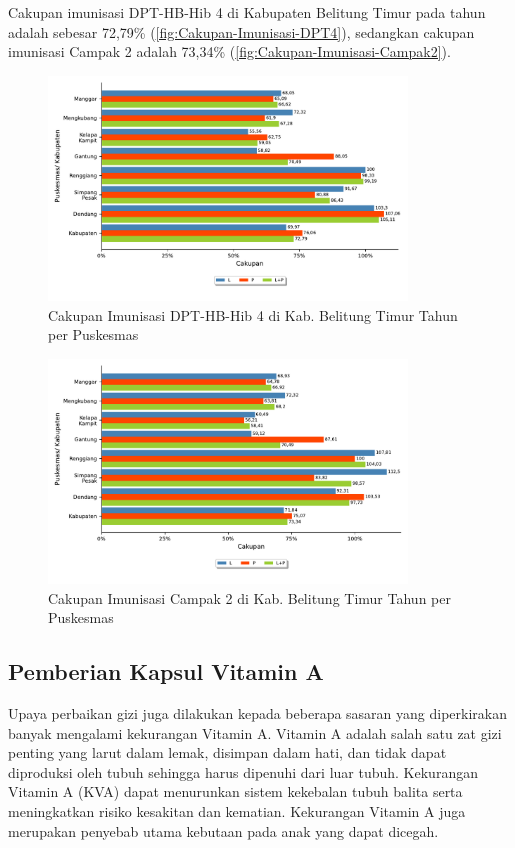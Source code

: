 Cakupan imunisasi DPT-HB-Hib 4 di Kabupaten Belitung Timur pada tahun \tP
adalah sebesar 72,79\% (\autoref{fig:Cakupan-Imunisasi-DPT4}), sedangkan cakupan imunisasi Campak 2 adalah 73,34\% (\autoref{fig:Cakupan-Imunisasi-Campak2}).

\begin{figure}[H]
    \centering
    \includegraphics[width=0.85\textwidth]{bab_05/bab_05_21a_imunDPTlanjut}
    \caption{Cakupan Imunisasi DPT-HB-Hib 4 di Kab. Belitung Timur Tahun \tP per Puskesmas}
    \label{fig:Cakupan-Imunisasi-DPT4}
\end{figure}

\begin{figure}[H]
    \centering
    \includegraphics[width=0.85\textwidth]{bab_05/bab_05_21b_imunCampakLanjut}
    \caption{Cakupan Imunisasi Campak 2 di Kab. Belitung Timur Tahun \tP per Puskesmas}
    \label{fig:Cakupan-Imunisasi-Campak2}
\end{figure}

\subsection{Pemberian Kapsul Vitamin A}
Upaya perbaikan gizi juga dilakukan kepada beberapa sasaran yang diperkirakan
banyak mengalami kekurangan Vitamin A. Vitamin A adalah salah satu
zat gizi penting yang larut dalam lemak, disimpan dalam hati, dan
tidak dapat diproduksi oleh tubuh sehingga harus dipenuhi dari luar
tubuh. Kekurangan Vitamin A (KVA) dapat menurunkan sistem kekebalan
tubuh balita serta meningkatkan risiko kesakitan dan kematian. Kekurangan
Vitamin A juga merupakan penyebab utama kebutaan pada anak yang dapat
dicegah.

